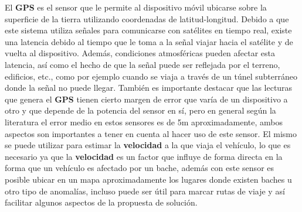 	El \textbf{GPS} es el sensor que le permite al dispositivo móvil ubicarse sobre la superficie de la tierra utilizando 
	coordenadas de latitud-longitud. Debido a que este sistema utiliza señales para comunicarse con satélites en 
	tiempo real, existe una latencia debido al tiempo que le toma a la señal viajar hacia el satélite y de vuelta 
	al dispositivo. Además, condiciones atmosféricas pueden afectar esta latencia, así como el hecho de que la señal 
	puede ser reflejada por el terreno, edificios, etc., como por ejemplo cuando se viaja a través de un túnel subterráneo 
	donde la señal no puede llegar. También es importante destacar que las lecturas que genera el \textbf{GPS} tienen cierto 
	margen de error que varía de un dispositivo a otro y que depende de la potencia del sensor en sí, pero en general según la 
	literatura el error medio en estos sensores es de 5m aproximadamente, ambos aspectos son importantes a tener en cuenta al 
	hacer uso de este sensor. El mismo se puede utilizar para estimar la \textbf{velocidad} a la que viaja el vehículo, lo que
	es necesario ya que la \textbf{velocidad} es un factor que influye de forma directa en la forma que un vehículo es afectado
	por un bache, además con este sensor es posible ubicar en un mapa aproximadamente los lugares donde existen baches u otro
	tipo de anomalías, incluso puede ser útil para marcar rutas de viaje y así facilitar algunos aspectos de la propuesta de
	solución.


